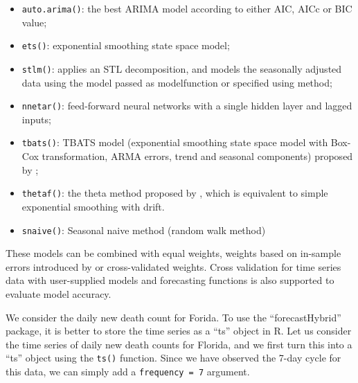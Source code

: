 \documentclass[]{book}
\newenvironment{Shaded}{\begin{snugshade}}{\end{snugshade}}
\newcommand{\KeywordTok}[1]{\textcolor[rgb]{0.13,0.29,0.53}{\textbf{#1}}}
\newcommand{\DataTypeTok}[1]{\textcolor[rgb]{0.13,0.29,0.53}{#1}}
\newcommand{\DecValTok}[1]{\textcolor[rgb]{0.00,0.00,0.81}{#1}}
\newcommand{\StringTok}[1]{\textcolor[rgb]{0.31,0.60,0.02}{#1}}
\newcommand{\OperatorTok}[1]{\textcolor[rgb]{0.81,0.36,0.00}{\textbf{#1}}}
\newcommand{\NormalTok}[1]{#1}
\begin{document}
\begin{itemize}
\item
  \texttt{auto.arima()}: the best ARIMA model according to either AIC,
  AICc or BIC value;
\item
  \texttt{ets()}: exponential smoothing state space model;
\item
  \texttt{stlm()}: applies an STL decomposition, and models the
  seasonally adjusted data using the model passed as modelfunction or
  specified using method;
\item
  \texttt{nnetar()}: feed-forward neural networks with a single hidden
  layer and lagged inputs;
\item
  \texttt{tbats()}: TBATS model (exponential smoothing state space model
  with Box-Cox transformation, ARMA errors, trend and seasonal
  components) proposed by \citet{de2011forecasting};
\item
  \texttt{thetaf()}: the theta method proposed by
  \citet{assimakopoulos2000theta}, which is equivalent to simple
  exponential smoothing with drift.
\item
  \texttt{snaive()}: Seasonal naive method (random walk method)
\end{itemize}

These models can be combined with equal weights, weights based on
in-sample errors introduced by \citet{bates1969combination} or
cross-validated weights. Cross validation for time series data with
user-supplied models and forecasting functions is also supported to
evaluate model accuracy.

We consider the daily new death count for Forida. To use the
``forecastHybrid'' package, it is better to store the time series as a
``ts'' object in R. Let us consider the time series of daily new death
counts for Florida, and we first turn this into a ``ts'' object using
the \texttt{ts()} function. Since we have observed the 7-day cycle for
this data, we can simply add a \texttt{frequency\ =\ 7} argument.

\begin{Shaded}
\end{Shaded}
\end{document}
